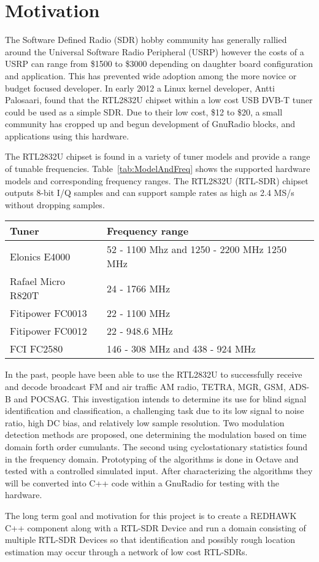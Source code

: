 \section*{Motivation}

The Software Defined Radio (SDR) hobby community has generally rallied around
the Universal Software Radio Peripheral (USRP) however the costs of a USRP can
range from \$1500 to \$3000 depending on daughter board configuration and
application.  This has prevented wide adoption among the more novice or budget
focused developer. In early 2012 a Linux kernel developer, Antti Palosaari, found
that the RTL2832U chipset within a low cost USB DVB-T tuner
could be used as a simple SDR.  Due to their low cost, \$12 to \$20, a
small community has cropped up and begun development of GnuRadio blocks, and
applications using this hardware.

The RTL2832U chipset is found in a variety of tuner models and provide a range
of tunable frequencies.
Table~\ref{tab:ModelAndFreq} shows the supported hardware models and
corresponding frequency ranges.  The RTL2832U (RTL-SDR) chipset outputs 8-bit
I/Q samples and can support sample rates as high as 2.4 MS/s without dropping samples.  

\begin{table*}
\centering
\caption{Tuner Model and Frequency Range Supported}
\begin{tabular}{| l | l |} \hline
Tuner	& Frequency range \\ \hline
Elonics E4000	& 52 - 1100 Mhz and 1250 - 2200 MHz 1250 MHz \\ \hline
Rafael Micro R820T &	24 - 1766 MHz \\ \hline
Fitipower FC0013 & 22 - 1100 MHz  \\ \hline
Fitipower FC0012 &	22 - 948.6 MHz \\ \hline
FCI FC2580	& 146 - 308 MHz and 438 - 924 MHz \\ \hline
\end{tabular}
\label{tab:ModelAndFreq}
\end{table*}

In the past, people have been able to use the RTL2832U to successfully
receive and decode broadcast FM and air traffic AM radio, TETRA, MGR, GSM, ADS-B
and POCSAG.  This investigation intends to determine its use for blind signal
identification and classification, a challenging task due to its low signal to
noise ratio, high DC bias, and relatively low sample resolution.  Two
modulation detection methods are proposed, one determining the modulation
based on time domain forth order cumulants.  The second using cyclostationary
statistics found in the frequency domain.  Prototyping of the algorithms
is done in Octave and tested with a controlled simulated input. 
After characterizing the algorithms they will be converted into C++ code
within a GnuRadio for testing with the hardware. 

The long term goal and motivation for this project is to create a REDHAWK C++
component along with a RTL-SDR Device and run a domain consisting of multiple
RTL-SDR Devices so that identification and possibly rough location 
estimation may occur through a network of low cost RTL-SDRs.

